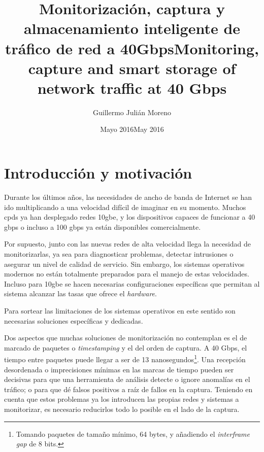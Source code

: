 \documentclass[oneside, draft]{epstfg}
\title[spa]{Monitorización, captura y almacenamiento inteligente de tráfico de red a 40Gbps}
\title[eng]{Monitoring, capture and smart storage of network traffic at 40 Gbps}
\author{Guillermo Julián Moreno}
\date[spa]{Mayo 2016}
\date[eng]{May 2016}
\begin{document}

\frontmatter

\maketitle[spa]
\maketitle[eng]

\makeinnertitle[spa]
\makeinnertitle[eng]

\makeabstract[spa]
\makeabstract[eng]

\tableofcontents
\clearsidepage
\listoftables
\clearsidepage
\listoffigures
\clearsidepage

\mainmatter

\chapter{Introducción y motivación}

Durante los últimos años, las necesidades de ancho de banda de Internet se han ido multiplicando a una velocidad difícil de imaginar en su momento. Muchos \glspl{cpd} ya han desplegado redes \gls{10gbe}, y los dispositivos capaces de funcionar a 40 \gls{gbps} o incluso a 100 \gls{gbps} ya están disponibles comercialmente.

Por supuesto, junto con las nuevas redes de alta velocidad llega la necesidad de monitorizarlas, ya sea para diagnosticar problemas, detectar intrusiones o asegurar un nivel de calidad de servicio. Sin embargo, los sistemas operativos modernos no están totalmente preparados para el manejo de estas velocidades. Incluso para \gls{10gbe} se hacen necesarias configuraciones específicas \cite{leitao2009tuning} que permitan al sistema alcanzar las tasas que ofrece el \textit{hardware}.

Para sortear las limitaciones de los sistemas operativos en este sentido son necesarias soluciones específicas y dedicadas.


Dos aspectos que muchas soluciones de monitorización no contemplan es el de marcado de paquetes o \textit{timestamping} y el del orden de captura. A 40 Gbps, el tiempo entre paquetes puede llegar a ser de 13 nanosegundos\footnote{Tomando paquetes de tamaño mínimo, 64 bytes, y añadiendo el \textit{interframe gap} de 8 bits.}. Una recepción desordenada o imprecisiones mínimas en las marcas de tiempo pueden ser decisivas para que una herramienta de análisis detecte o ignore anomalías en el tráfico; o para que dé falsos positivos a raíz de fallos en la captura. Teniendo en cuenta que estos problemas ya los introducen las propias redes y sistemas a monitorizar, es necesario reducirlos todo lo posible en el lado de la captura.
\end{document}

